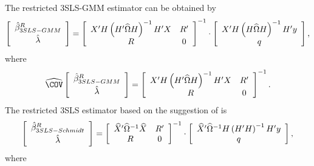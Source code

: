 The restricted 3SLS-GMM estimator can be obtained by
\begin{equation}
   \left[ \begin{array}{c}
      \hat{\beta}^R_{3SLS-GMM} \\[0.2em] \hat{\lambda}
   \end{array} \right]
   =
   \left[ \begin{array}{cc}
      X' H \left( H' \widehat{\Omega} H \right)^{-1} H' X & R' \\
      R & 0
   \end{array} \right]^{-1}
   \cdot
   \left[ \begin{array}{c}
      X' H \left( H \widehat{\Omega} H \right)^{-1} H' y \\ q
   \end{array} \right] ,
   \label{eq:3slsGmmR}
\end{equation}
where
\begin{equation}
   \COVHat
   \left[ \begin{array}{c}
      \bHat^R_{3SLS-GMM} \\[0.2em] \lHat
   \end{array} \right] 
   = 
   \left[ \begin{array}{cc}
      X' H \left( H' \OHat H \right)^{-1} H' X & R' \\
      R & 0
   \end{array} \right]^{-1} .
\end{equation}
The restricted 3SLS estimator based on the suggestion of
\cite{schmidt90} is
\begin{equation}
   \left[ \begin{array}{c}
      \hat{\beta}^R_{3SLS-Schmidt} \\[0.2em] \hat{\lambda}
   \end{array} \right]
   =
   \left[ \begin{array}{cc}
      \widehat{X}' \widehat{\Omega}^{-1} \widehat{X} & R' \\
      R & 0
   \end{array} \right]^{-1}
   \cdot
   \left[ \begin{array}{c}
      \widehat{X}' \widehat{\Omega}^{-1} H \left( H' H \right)^{-1} H' y \\ q
   \end{array} \right] ,
   \label{eq:3slsSchmidtR}
\end{equation}
where

